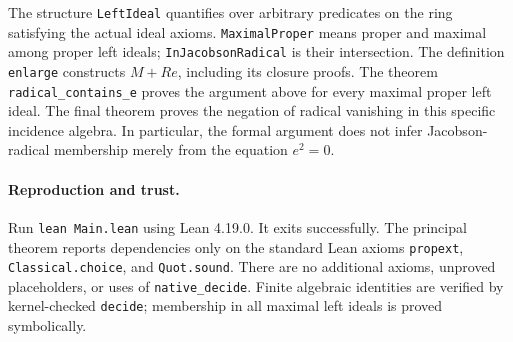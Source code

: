 \documentclass[10pt]{article}
\begin{document}
The structure \texttt{LeftIdeal} quantifies over arbitrary predicates
on the ring satisfying the actual ideal axioms.
\texttt{MaximalProper} means proper and maximal among proper left
ideals; \texttt{InJacobsonRadical} is their intersection.
The definition \texttt{enlarge} constructs $M+Re$, including its
closure proofs. The theorem \texttt{radical\_contains\_e} proves the
argument above for every maximal proper left ideal.
The final theorem  proves the
negation of radical vanishing in this specific incidence algebra.
In particular, the formal argument does not infer Jacobson-radical
membership merely from the equation $e^2=0$.

\paragraph{Reproduction and trust.}
Run \texttt{lean Main.lean} using Lean 4.19.0. It exits successfully.
The principal theorem reports dependencies only on the standard Lean
axioms \texttt{propext}, \texttt{Classical.choice}, and
\texttt{Quot.sound}. There are no additional axioms, unproved
placeholders, or uses of \texttt{native\_decide}. Finite algebraic
identities are verified by kernel-checked \texttt{decide}; membership
in all maximal left ideals is proved symbolically.
\end{document}
